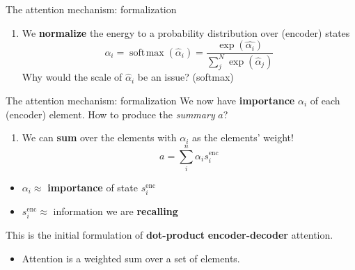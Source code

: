 \documentclass[12pt,aspectratio=169,handout]{beamer}
\DeclareMathOperator*{\softmax}{soft\!\max}
\newcounter{saveenumi}
\newcommand{\seti}{\setcounter{saveenumi}{\value{enumi}}}
\newcommand{\conti}{\setcounter{enumi}{\value{saveenumi}}}
\begin{document}
\begin{frame}{The attention mechanism: formalization}
	
	\begin{enumerate}
		\conti
		\item We \textbf{normalize} the energy to a probability distribution over (encoder) states
		$$
		\alpha_i = \softmax(\hat{\alpha}_i) = \frac{\exp(\hat{\alpha_i})}{\sum_j^N \exp(\hat{\alpha}_j)}
		$$
		\seti
		\pause
		Why would the scale of $\hat{\alpha}_i$ be an issue? \pause (softmax)
		
	\end{enumerate}
	
\end{frame}

\begin{frame}{The attention mechanism: formalization}
	We now have \textbf{importance} $\alpha_i$ of each (encoder) element. How to produce the \textit{summary} $a$?

	\begin{enumerate}
		\conti
		\item We can \textbf{sum} over the elements with $\alpha_i$ as the elements' weight!
		$$
			a = \sum_i^n \alpha_i s_i^{\text{enc}}
		$$

	\end{enumerate}

\pause

\begin{itemize}
	\item $\alpha_i \approx $ \textbf{importance} of state $s_i^{\text{enc}}$   
	\item $s_i^{\text{enc}} \approx $ information we are \textbf{recalling} 
\end{itemize}

\pause

This is the initial formulation of \textbf{dot-product} \textbf{encoder-decoder} attention.
\pause
\begin{itemize}
	\item Attention is a weighted sum over a set of elements.
\end{itemize}
	
\end{frame}
\end{document}
